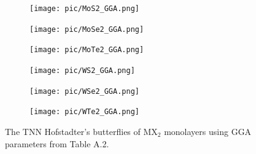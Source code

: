 \documentclass{report}
\begin{document}
\begin{figure}[htb]
	\centering
	\begin{subfigure}[b]{0.32\linewidth}
		\centering
		\texttt{[image: pic/MoS2\_GGA.png]}
	\end{subfigure}
	\begin{subfigure}[b]{0.32\linewidth}
		\centering
		\texttt{[image: pic/MoSe2\_GGA.png]}
	\end{subfigure}
	\begin{subfigure}[b]{0.32\linewidth}
		\centering
		\texttt{[image: pic/MoTe2\_GGA.png]}
	\end{subfigure}
	\begin{subfigure}[b]{0.32\linewidth}
		\centering
		\texttt{[image: pic/WS2\_GGA.png]}
	\end{subfigure}
	\begin{subfigure}[b]{0.32\linewidth}
		\centering
		\texttt{[image: pic/WSe2\_GGA.png]}
	\end{subfigure}
	\begin{subfigure}[b]{0.32\linewidth}
		\centering
		\texttt{[image: pic/WTe2\_GGA.png]}
	\end{subfigure}
	\caption[Showcase TNN Hofstadter’s butterflies of MX$_{2}$ monolayers.]{
		The \ac{TNN} Hofstadter’s butterflies of MX$_{2}$ monolayers using GGA parameters from Table A.2.
	}
\end{figure}


\end{document}
